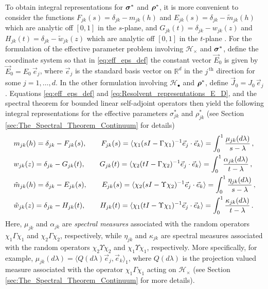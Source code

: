 \documentclass{cmslatex}
\newcommand\bsig{\mbox{\boldmath${\sigma}$}}
\newcommand\brho{\mbox{\boldmath${\rho}$}}
\begin{document}
To obtain integral representations for $\bsig^*$ and
$\brho^*$, it is more convenient to consider the functions 
$F_{jk}(s)=\delta_{jk}-m_{jk}(h)$ and $E_{jk}(s)=\delta_{jk}-\tilde{m}_{jk}(h)$
which are analytic off $[0,1]$ in the $s$-plane, and
$G_{jk}(t)=\delta_{jk}-w_{jk}(z)$ and $H_{jk}(t)=\delta_{jk}-\tilde{w}_{jk}(z)$
which are analytic off $[0,1]$ in the $t$-plane
\cite{Golden:CMP-473}. For the formulation of the effective parameter
problem involving $\mathscr{H}_\times$ and $\bsig^*$, define the
coordinate system so that in \eqref{eq:eff_eps_def} the constant
vector $\vec{E}_0$ is given by $\vec{E}_0=E_0\,\vec{e}_j$, where
$\vec{e}_j$ is the standard basis vector on $\mathbb{R}^d$ in the
$j^{\,\text{th}}$ direction for some $j=1,\ldots,d$. In the other
formulation involving $\mathscr{H}_\bullet$ and $\brho^*$, define
$\vec{J}_0=J_0\,\vec{e}_j$. Equations \eqref{eq:eff_eps_def} and 
\eqref{eq:Resolvent_representations_E_D}, and the spectral theorem for
bounded linear self-adjoint operators \cite{Reed-1980,Stone:64} then
yield the following integral representations
\cite{Golden:CMP-473,Bergman:PRC-377,Bergman:AP-78,Murphy:JMP:063506}  
for the effective parameters $\sigma^*_{jk}$ and $\rho^*_{jk}$ (see Section
\ref{sec:The_Spectral_Theorem_Continuum} for details)
%
\begin{align}\label{eq:Stieltjes_F}
  &m_{jk}(h)=\delta_{jk}-F_{jk}(s), \qquad
  F_{jk}(s)=\langle\chi_1(sI-\Gamma\chi_1)^{-1}\vec{e}_j\cdot\vec{e}_k\rangle=\int_0^1\frac{\mu_{jk}(d\lambda)}{s-\lambda}\,,
  \\
  &w_{jk}(z)=\delta_{jk}-G_{jk}(t), \qquad
  G_{jk}(t)=\langle\chi_2(tI-\Gamma\chi_2)^{-1}\vec{e}_j\cdot\vec{e}_k\rangle=\int_0^1\frac{\alpha_{jk}(d\lambda)}{t-\lambda}\,,
  \notag \\
  &\tilde{m}_{jk}(h)=\delta_{jk}-E_{jk}(s), \qquad
  E_{jk}(s)=\langle\chi_2(sI-\Upsilon\chi_2)^{-1}\vec{e}_j\cdot\vec{e}_k\rangle=\int_0^1\frac{\eta_{jk}(d\lambda)}{s-\lambda}\,,
  \notag \\
  &\tilde{w}_{jk}(z)=\delta_{jk}-H_{jk}(t), \qquad
  H_{jk}(t)=\langle\chi_1(tI-\Upsilon\chi_1)^{-1}\vec{e}_j\cdot\vec{e}_k\rangle=\int_0^1\frac{\kappa_{jk}(d\lambda)}{t-\lambda}\,.
  \notag
\end{align}
%
Here, $\mu_{jk}$ and $\alpha_{jk}$ are \emph{spectral measures} associated
with the random operators $\chi_1\Gamma\chi_1$ and $\chi_2\Gamma\chi_2$, respectively, while
$\eta_{jk}$ and $\kappa_{jk}$ are spectral measures associated
with the random operators $\chi_2\Upsilon\chi_2$ and $\chi_1\Upsilon\chi_1$, respectively. More
specifically, for example, $\mu_{jk}(d\lambda)=\langle Q(d\lambda)\vec{e}_j,\vec{e}_k\rangle_1$,
where $Q(d\lambda)$ is the projection valued measure associated with the
operator $\chi_1\Gamma\chi_1$ acting on $\mathscr{H}_\times$ (see Section
\ref{sec:The_Spectral_Theorem_Continuum} for more details).   
\end{document}
